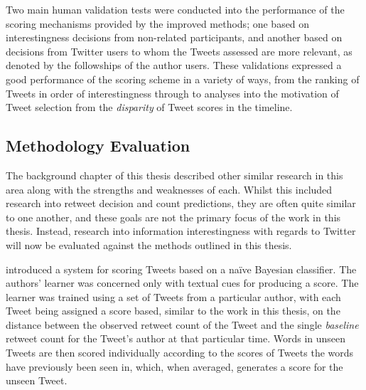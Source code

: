 Two main human validation tests were conducted into the performance of the scoring mechanisms provided by the improved methods; one based on interestingness decisions from non-related participants, and another based on decisions from Twitter users to whom the Tweets assessed are more relevant, as denoted by the followships of the author users. These validations expressed a good performance of the scoring scheme in a variety of ways, from the ranking of Tweets in order of interestingness through to analyses into the motivation of Tweet selection from the \textit{disparity} of Tweet scores in the timeline.


\subsection{Methodology Evaluation}
The background chapter of this thesis described other similar research in this area along with the strengths and weaknesses of each. Whilst this included research into retweet decision and count predictions, they are often quite similar to one another, and these goals are not the primary focus of the work in this thesis. Instead, research into information interestingness with regards to Twitter will now be evaluated against the methods outlined in this thesis.

\cite{gransee12} introduced a system for scoring Tweets based on a na{\"i}ve Bayesian classifier. The authors' learner was concerned only with textual cues for producing a score. The learner was trained using a set of Tweets from a particular author, with each Tweet being assigned a score based, similar to the work in this thesis, on the distance between the observed retweet count of the Tweet and the single \textit{baseline} retweet count for the Tweet's author at that particular time. Words in unseen Tweets are then scored individually according to the scores of Tweets the words have previously been seen in, which, when averaged, generates a score for the unseen Tweet.

